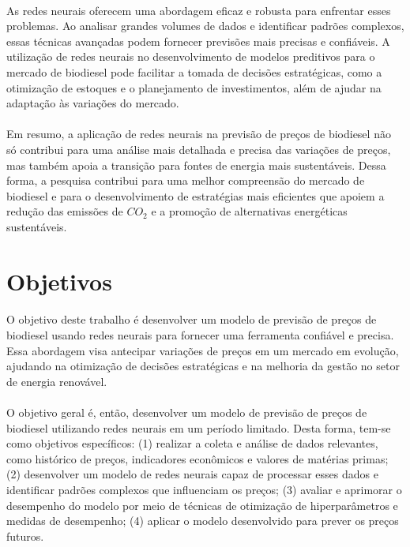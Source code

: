 \paragraph{} As redes neurais oferecem uma abordagem eficaz e robusta para enfrentar esses problemas. Ao analisar grandes volumes de dados e identificar padrões complexos, essas técnicas avançadas podem fornecer previsões mais precisas e confiáveis. A utilização de redes neurais no desenvolvimento de modelos preditivos para o mercado de biodiesel pode facilitar a tomada de decisões estratégicas, como a otimização de estoques e o planejamento de investimentos, além de ajudar na adaptação às variações do mercado.
\paragraph{} Em resumo, a aplicação de redes neurais na previsão de preços de biodiesel não só contribui para uma análise mais detalhada e precisa das variações de preços, mas também apoia a transição para fontes de energia mais sustentáveis. Dessa forma, a pesquisa contribui para uma melhor compreensão do mercado de biodiesel e para o desenvolvimento de estratégias mais eficientes que apoiem a redução das emissões de \(CO_2\) e a promoção de alternativas energéticas sustentáveis.

\section{Objetivos}

\paragraph{} O objetivo deste trabalho é desenvolver um modelo de previsão de preços de biodiesel usando redes neurais para fornecer uma ferramenta confiável e precisa. Essa abordagem visa antecipar variações de preços em um mercado em evolução, ajudando na otimização de decisões estratégicas e na melhoria da gestão no setor de energia renovável.
\paragraph{} O objetivo geral é, então, desenvolver um modelo de previsão de preços de biodiesel utilizando redes neurais em um período limitado. Desta forma, tem-se como objetivos específicos: (1) realizar a coleta e análise de dados relevantes, como histórico de preços, indicadores econômicos e valores de matérias primas; (2) desenvolver um modelo de redes neurais capaz de processar esses dados e identificar padrões complexos que influenciam os preços; (3) avaliar e aprimorar o desempenho do modelo por meio de técnicas de otimização de hiperparâmetros e medidas de desempenho; (4) aplicar o modelo desenvolvido para prever os preços futuros.

